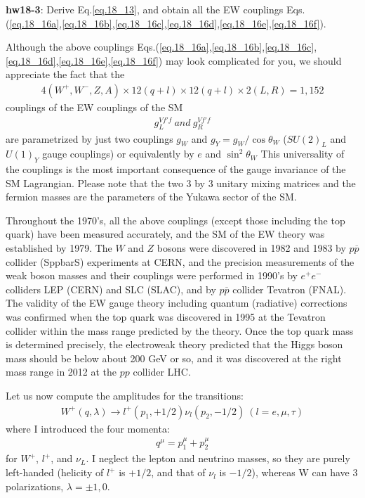 \documentclass[12pt]{article}
\begin{document}
{\bf hw18-3}: Derive Eq.\ref{eq.18_13}, and obtain all the EW couplings Eqs.(\ref{eq.18_16a},\ref{eq.18_16b},\ref{eq.18_16c},\ref{eq.18_16d},\ref{eq.18_16e},\ref{eq.18_16f}).

Although the above couplings Eqs.(\ref{eq.18_16a},\ref{eq.18_16b},\ref{eq.18_16c},\ref{eq.18_16d},\ref{eq.18_16e},\ref{eq.18_16f}) may look complicated for you, we should appreciate the fact that the
\begin{eqnarray}
    4(W^+,W^-,Z,A) \times 12(q+l) \times 12(q+l) \times 2(L,R) = 1,152
\end{eqnarray}
couplings of the EW couplings of the SM
\begin{eqnarray}
    g_L^{Vf'f} ~and~ g_R^{Vf'f} \label{eq.18_18}
\end{eqnarray}
are parametrized by just two couplings $g_W$ and $g_Y=g_W/\cos\theta_W$ ($SU(2)_L$ and $U(1)_Y$ gauge couplings) or equivalently by $e$ and $\sin^2\theta_W$
This universality of the couplings is the most important
consequence of the gauge invariance of the SM Lagrangian.
Please note that the two $3$ by $3$ unitary mixing matrices and the
fermion masses are the parameters of the Yukawa sector of the SM.

Throughout the 1970's, all the above couplings (except those including
the top quark) have been measured accurately, and the SM of the EW
theory was established by 1979.
The $W$ and $Z$ bosons were discovered in 1982 and 1983 by $p{\overline p}$ collider (SppbarS) experiments at CERN, and the precision measurements of the
weak boson masses and their couplings were performed in 1990's by
$e^+e^-$ colliders LEP (CERN) and SLC (SLAC), and by $p{\overline p}$ collider
Tevatron (FNAL). The validity of the EW gauge theory including
quantum (radiative) corrections was confirmed when the top quark
was discovered in 1995 at the Tevatron collider within the mass range
predicted by the theory. Once the top quark mass is determined
precisely, the electroweak theory predicted that the Higgs boson
mass should be below about 200 GeV or so, and it was discovered
at the right mass range in 2012 at the $pp$ collider LHC.

Let us now compute the amplitudes for the transitions:
\begin{eqnarray}
    W^+(q,\lambda) \to l^+(p_1,+1/2) \nu_l(p_2,-1/2)~(l=e,\mu,\tau)\label{eq.18_20}
\end{eqnarray}
where I introduced the four momenta:
\begin{eqnarray}
    q^\mu = p_1^\mu + p_2^\mu \label{eq.18_21}
\end{eqnarray}
for $W^+$, $l^+$, and $\nu_L$. I neglect the lepton and neutrino masses,
so they are purely left-handed (helicity of $l^+$ is $+1/2$, and that of
$\nu_l$ is $-1/2$), whereas W can have 3 polarizations, $\lambda = \pm1,0$.
\end{document}
